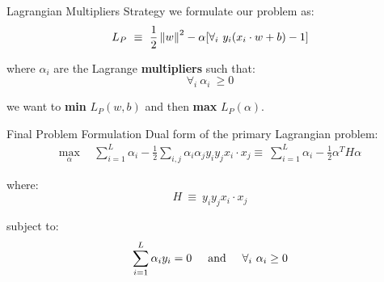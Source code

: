 \begin{frame}[fragile]{Lagrangian Multipliers Strategy}
  we formulate our problem as:
  \newline
  \begin{equation*}
    \begin{split}
      L_P\ \equiv\ \frac{1}{2} \left\lVert w\right\rVert^2 - \alpha [\forall_i\  y_i (x_i \cdot w + b) - 1]
    \end{split}
  \end{equation*}

  where $\alpha_i$ are the Lagrange \textbf{multipliers} such that:
  \begin{equation*}
    \forall_i\ \alpha_i\ \geq 0 
  \end{equation*}

  we want to \textbf{min} $L_P(w,b)$ and then \textbf{max} $L_P(\alpha)$.
\end{frame}


\begin{frame}[fragile]{Final Problem Formulation}
  Dual form of the primary Lagrangian problem:
  \newline
  \begin{equation*}
    \begin{split}
      \max_{\alpha}\ &\ \sum_{i=1}^{L} \alpha_i - \frac{1}{2} \sum_{i,j} \alpha_i \alpha_j y_i y_j x_i \cdot x_j
      \equiv\ \sum_{i=1}^{L} \alpha_i - \frac{1}{2} \alpha^T H \alpha
    \end{split}
  \end{equation*}

  where:
  \newline
  \begin{equation*}
    H\ \equiv\ y_i y_j x_i \cdot x_j
  \end{equation*}

  subject to:
  \newline
  \begin{equation*}
    \sum_{i=1}^{L} \alpha_i y_i = 0 \hspace{.5cm} \text{and} \hspace{.5cm} \forall_i\ \alpha_i \geq 0 
  \end{equation*}
\end{frame}
